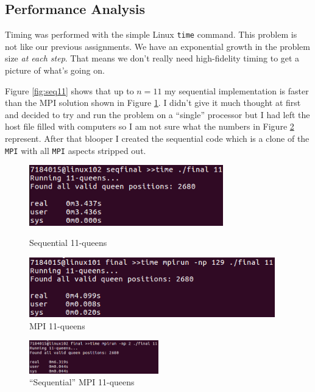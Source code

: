 \documentclass{article}
\begin{document}
\subsection{Performance Analysis}
Timing was performed with the simple Linux \verb|time| command. This problem is 
not like our previous assignments. We have an exponential growth in the problem 
size \textit{at each step}. That means we don't really need high-fidelity timing 
to get a picture of what's going on. 

Figure \ref{fig:seq11} shows that up to $n=11$ my sequential implementation is 
faster than the MPI solution shown in Figure \ref{fig:mpi11}. I didn't give it 
much thought at first and decided to try and run the problem on a ``single'' 
processor but I had left the host file filled with computers so I am not sure 
what the numbers in Figure \ref{fig:mpiseq11} represent. After that blooper I 
created the sequential code which is a clone of the \verb|MPI| with all 
\verb|MPI| aspects stripped out. 

\begin{figure}[h]
    \centering
    \begin{minipage}{0.49\textwidth}
        \centering
        \includegraphics[width=0.75\textwidth]{images/MPI_2_11}
        \caption{Sequential 11-queens}
        \label{fig:seq11}
    \end{minipage}\hfill
    \begin{minipage}{0.49\textwidth}
        \centering
        \includegraphics[width=0.95\textwidth]{images/MPI_11}
        \caption{MPI 11-queens}
        \label{fig:mpi11}
    \end{minipage}
\end{figure}


\begin{figure}[h]
    \centering
    \includegraphics[width=0.5\textwidth]{images/MPI_1_11}
    \caption{``Sequential'' MPI 11-queens}
    \label{fig:mpiseq11}
\end{figure}
\end{document}
